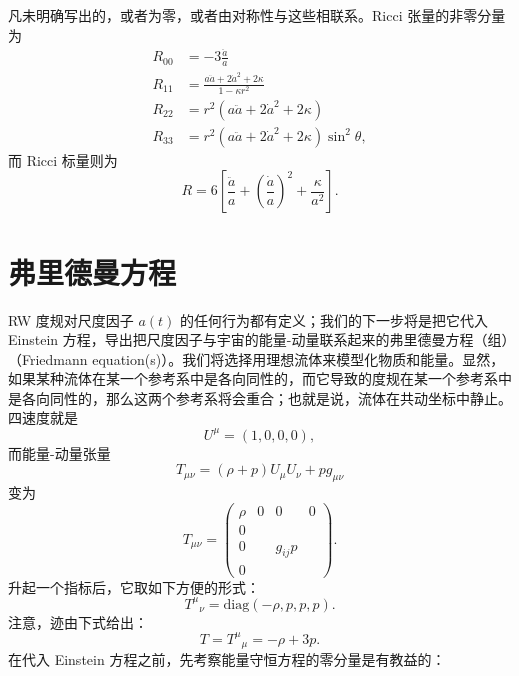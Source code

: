 凡未明确写出的，或者为零，或者由对称性与这些相联系。Ricci 张量的非零分量为
\begin{equation*}
\begin{aligned}
R_{00} &= -3\frac{\ddot{a}}{a}\\[4pt]
R_{11} &= \frac{a\ddot{a} + 2\dot{a}^2 + 2\kappa}{1-\kappa r^2}\\[4pt]
R_{22} &= r^2\left(a\ddot{a} + 2\dot{a}^2 + 2\kappa\right)\\
R_{33} &= r^2\left(a\ddot{a} + 2\dot{a}^2 + 2\kappa\right)\sin^2\theta,
\end{aligned}
\tag{8.45}
\end{equation*}
而 Ricci 标量则为
\begin{equation*}
R = 6\left[\frac{\ddot{a}}{a} + \left(\frac{\dot{a}}{a}\right)^2 + \frac{\kappa}{a^2}\right].
\tag{8.46}
\end{equation*}

\section{弗里德曼方程}

RW 度规对尺度因子 $a(t)$ 的任何行为都有定义；我们的下一步将是把它代入 Einstein 方程，导出把尺度因子与宇宙的能量-动量联系起来的弗里德曼方程（组）（Friedmann equation(s)）。我们将选择用理想流体来模型化物质和能量。显然，如果某种流体在某一个参考系中是各向同性的，而它导致的度规在某一个参考系中是各向同性的，那么这两个参考系将会重合；也就是说，流体在共动坐标中静止。四速度就是
\begin{equation*}
U^\mu = (1, 0, 0, 0),
\tag{8.47}
\end{equation*}
而能量-动量张量
\begin{equation*}
T_{\mu\nu} = (\rho + p)U_\mu U_\nu + pg_{\mu\nu}
\tag{8.48}
\end{equation*}
变为
\begin{equation*}
T_{\mu\nu} = \left(\begin{array}{cccc}
\rho & 0 & 0 & 0\\
0 & & & \\
0 & & g_{ij}p & \\
0 & & &
\end{array}\right).
\tag{8.49}
\end{equation*}
升起一个指标后，它取如下方便的形式：
\begin{equation*}
T^\mu{}_\nu = \mathrm{diag}(-\rho, p, p, p).
\tag{8.50}
\end{equation*}
注意，迹由下式给出：
\begin{equation*}
T = T^\mu{}_\mu = -\rho + 3p.
\tag{8.51}
\end{equation*}
在代入 Einstein 方程之前，先考察能量守恒方程的零分量是有教益的：


